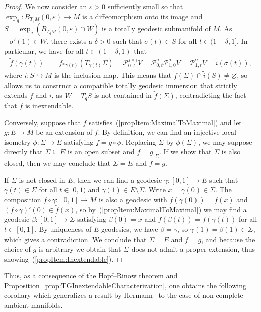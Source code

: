 \documentclass[11pt,a4paper,final]{amsart}
\renewcommand{\tilde}{\widetilde}
\theoremstyle{definition}
\begin{document}
\begin{proof}
	We now consider an $\varepsilon > 0$ sufficiently small so that $\exp_{q}\colon B_{T_{q}M}(0,\varepsilon)\to M$ is a diffeomorphism onto its image and $S=\exp_{q}(B_{T_{q}M}(0,\varepsilon)\cap W)$ is a totally geodesic submanifold of $M$.
	As $-\sigma'(1)\in W$, there exists a $\delta > 0$ such that $\sigma(t)\in S$ for all $t\in (1-\delta,1]$.
	In particular, we have for all $t\in (1-\delta,1)$ that
	\[
	\begin{aligned}
		\tilde{f}(\gamma(t))={}&f_{*\gamma(t)}(T_{\gamma(t)}\Sigma)=\mathcal{P}_{0,t}^{f\circ\gamma}V=\mathcal{P}_{0,t}^{\sigma}\mathcal{P}_{1,0}^{\sigma}V=\mathcal{P}_{1,t}^{\sigma}V=\tilde{i}(\sigma(t)),
	\end{aligned}
	\]
	where $i\colon S\hookrightarrow M$ is the inclusion map.
	This means that $\tilde{f}(\Sigma)\cap\tilde{i}(S)\neq \varnothing$, so~\cite[Lemma~10.3.1]{BerndtConsoleOlmos} allows us to construct a compatible totally geodesic immersion that strictly extends $f$ and $i$, as $W=T_q S$ is not contained in $\widetilde{f}(\Sigma)$, contradicting the fact that $f$ is inextendable.
	
	Conversely, suppose that $f$ satisfies~(\ref{propItem:MaximalToMaximal}) and let $g\colon E\to M$ be an extension of $f$.
	By definition, we can find an injective local isometry $\phi\colon \Sigma\to E$ satisfying $f=g\circ \phi$.
	Replacing $\Sigma$ by $\phi(\Sigma)$, we may suppose directly that $\Sigma\subseteq E$ is an open subset and $f=g\vert_{\Sigma}$.
	If we show that $\Sigma$ is also closed, then we may conclude that $\Sigma=E$ and $f=g$.
	
	If $\Sigma$ is not closed in $E$, then we can find a geodesic $\gamma\colon [0,1]\to E$ such that $\gamma(t)\in\Sigma$ for all $t\in [0,1)$ and $\gamma(1)\in E\setminus \Sigma$.
	Write $x=\gamma(0)\in \Sigma$.
	The composition $f\circ \gamma\colon [0,1]\to M$ is also a geodesic with $f(\gamma(0))=f(x)$ and $(f\circ \gamma)'(0)\in \tilde{f}(x)$, so by~(\ref{propItem:MaximalToMaximal}) we may find a geodesic $\beta\colon [0,1]\to \Sigma$ satisfying $\beta(0)=x$ and $f(\beta(t))=f(\gamma(t))$ for all $t\in [0,1]$.
	By uniqueness of $E$-geodesics, we have $\beta=\gamma$, so $\gamma(1)=\beta(1)\in \Sigma$, which gives a contradiction.
	We conclude that $\Sigma=E$ and $f=g$, and because the choice of $g$ is arbitrary we obtain that $\Sigma$ does not admit a proper extension, thus showing~(\ref{propItem:Inextendable}). \qedhere
\end{proof}
Thus, as a consequence of the Hopf--Rinow theorem and Proposition~\ref{prop:TGInextendableCharacterization}, one obtains the following corollary which generalizes a result by Hermann~\cite{HermannCompleteTotallyGeodesic} to the case of non-complete ambient manifolds.
\end{document}

